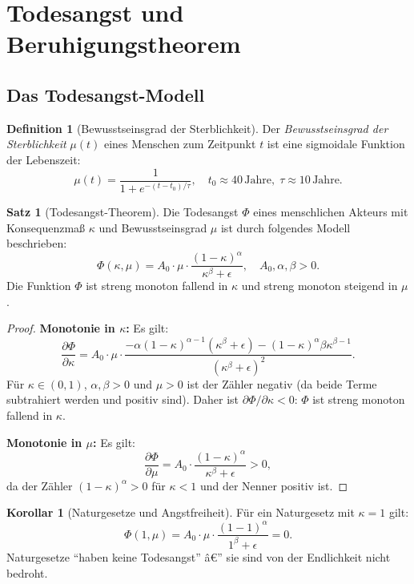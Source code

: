 ﻿\documentclass[a4paper,12pt]{article}
\theoremstyle{definition}
\newtheorem{definition}{Definition}
\newtheorem{satz}{Satz}
\newtheorem{korollar}{Korollar}
\begin{document}
\section{Todesangst und Beruhigungstheorem}

\subsection{Das Todesangst-Modell}

\begin{definition}[Bewusstseinsgrad der Sterblichkeit]
Der \emph{Bewusstseinsgrad der Sterblichkeit} $\mu(t)$ eines Menschen zum Zeitpunkt $t$ ist eine sigmoidale Funktion der Lebenszeit:
\[
\mu(t) = \frac{1}{1 + e^{-(t - t_0)/\tau}}, \quad t_0 \approx 40\,\text{Jahre}, \; \tau \approx 10\,\text{Jahre}.
\]
\end{definition}

\begin{satz}[Todesangst-Theorem]
\label{satz:angst}
Die Todesangst $\Phi$ eines menschlichen Akteurs mit Konsequenzmaß $\kappa$ und Bewusstseinsgrad $\mu$ ist durch folgendes Modell beschrieben:
\[
\Phi(\kappa, \mu) = A_0 \cdot \mu \cdot \frac{(1 - \kappa)^{\alpha}}{\kappa^{\beta} + \epsilon}, \quad A_0, \alpha, \beta > 0.
\]
Die Funktion $\Phi$ ist streng monoton fallend in $\kappa$ und streng monoton steigend in $\mu$.
\end{satz}

\begin{proof}
\textbf{Monotonie in $\kappa$:} Es gilt:
\[
\frac{\partial \Phi}{\partial \kappa} = A_0 \cdot \mu \cdot \frac{-\alpha(1-\kappa)^{\alpha-1}(\kappa^\beta + \epsilon) - (1-\kappa)^\alpha \beta \kappa^{\beta-1}}{(\kappa^\beta + \epsilon)^2}.
\]
Für $\kappa \in (0,1)$, $\alpha, \beta > 0$ und $\mu > 0$ ist der Zähler negativ (da beide Terme subtrahiert werden und positiv sind). Daher ist $\partial \Phi / \partial \kappa < 0$: $\Phi$ ist streng monoton fallend in $\kappa$.

\textbf{Monotonie in $\mu$:} Es gilt:
\[
\frac{\partial \Phi}{\partial \mu} = A_0 \cdot \frac{(1-\kappa)^{\alpha}}{\kappa^{\beta} + \epsilon} > 0,
\]
da der Zähler $(1-\kappa)^\alpha > 0$ für $\kappa < 1$ und der Nenner positiv ist. \qedhere
\end{proof}

\begin{korollar}[Naturgesetze und Angstfreiheit]
\label{kor:nl_angstfrei}
Für ein Naturgesetz mit $\kappa = 1$ gilt:
\[
\Phi(1, \mu) = A_0 \cdot \mu \cdot \frac{(1 - 1)^{\alpha}}{1^{\beta} + \epsilon} = 0.
\]
Naturgesetze ``haben keine Todesangst'' â€” sie sind von der Endlichkeit nicht bedroht.
\end{korollar}
\end{document}
